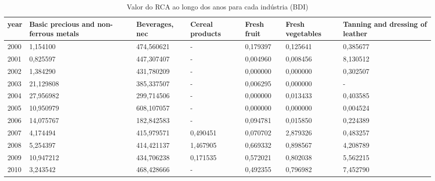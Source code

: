 \begin{table}
\centering
\caption{Valor do RCA ao longo dos anos para cada indústria (BDI)}
\begin{tabular}{p{1cm}p{2cm}p{2cm}p{2cm}p{2cm}p{2cm}p{2cm}}
\toprule
 year &  Basic precious and non-ferrous metals &  Beverages, nec &  Cereal products &  Fresh fruit &  Fresh vegetables &  Tanning and dressing of leather \\
\midrule
 2000 &                               1,154100 &      474,560621 &                - &     0,179397 &          0,125641 &                         0,385677 \\
 2001 &                               0,825597 &      447,307407 &                - &     0,004960 &          0,008456 &                         8,130512 \\
 2002 &                               1,384290 &      431,780209 &                - &     0,000000 &          0,000000 &                         0,302507 \\
 2003 &                              21,129808 &      385,337507 &                - &     0,006295 &          0,000000 &                                - \\
 2004 &                              27,956982 &      299,714506 &                - &     0,000000 &          0,013433 &                         0,403585 \\
 2005 &                              10,950979 &      608,107057 &                - &     0,000000 &          0,000000 &                         0,004524 \\
 2006 &                              14,075767 &      182,842583 &                - &     0,094781 &          0,015850 &                         0,224389 \\
 2007 &                               4,174494 &      415,979571 &         0,490451 &     0,070702 &          2,879326 &                         0,483257 \\
 2008 &                               5,254397 &      414,421137 &         1,467905 &     0,669332 &          0,898567 &                         4,208789 \\
 2009 &                              10,947212 &      434,706238 &         0,171535 &     0,572021 &          0,802038 &                         5,562215 \\
 2010 &                               3,243542 &      468,428666 &                - &     0,492355 &          0,796982 &                         7,452790 \\

\end{tabular}
\end{table}
